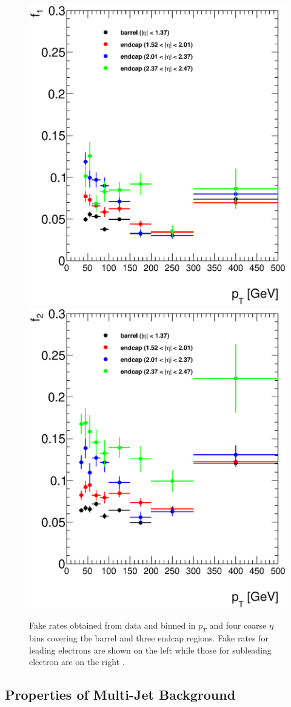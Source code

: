    \begin{figure}[h]
      \begin{center}
      \includegraphics[width=0.48\linewidth]{images/f1.eps}
      \includegraphics[width=0.48\linewidth]{images/f2.eps}
      \end{center}
   \caption{Fake rates obtained from data and binned in $p_{T}$ and four coarse $\eta$ bins covering the barrel and three endcap regions. Fake rates for leading electrons are shown on the left while those for subleading electron are on the right \cite{Z':1564935}.}
   \label{fig:fakeRates}
   \end{figure}




\subsection{Properties of Multi-Jet Background}


